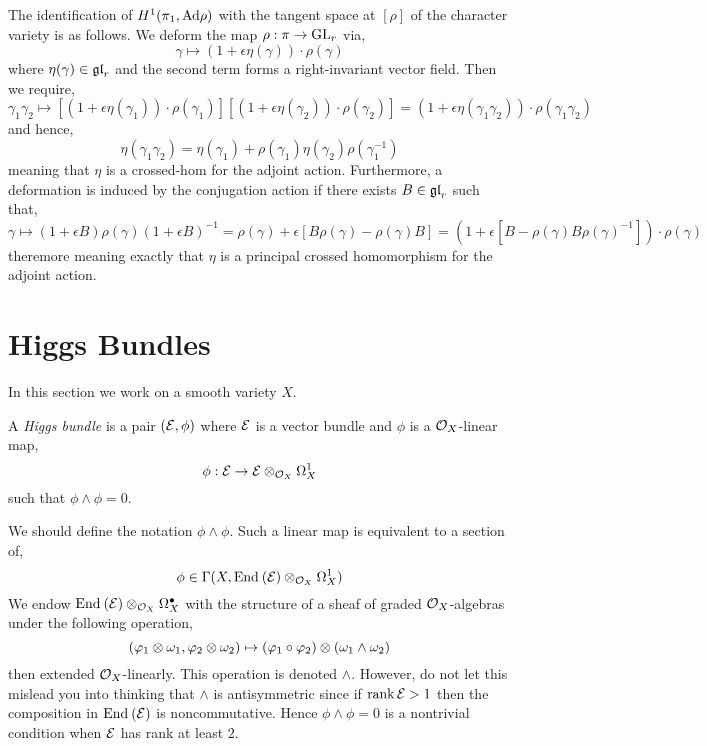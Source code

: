 \documentclass[12pt]{article}
\begin{document}
\begin{rmk}
The identification of $H^1(\pi_1, \mathrm{Ad}{\rho})$ with the tangent space at $[\rho]$ of the character variety is as follows. We deform the map $\rho : \pi \to \mathrm{GL}_r$ via,
\[ \gamma \mapsto (1 + \epsilon \eta(\gamma)) \cdot \rho(\gamma) \]
where $\eta(\gamma) \in \mathfrak{gl}_r$ and the second term forms a right-invariant vector field. Then we require,
\[ \gamma_1 \gamma_2 \mapsto [(1 + \epsilon \eta(\gamma_1)) \cdot \rho(\gamma_1)][(1 + \epsilon \eta(\gamma_2)) \cdot \rho(\gamma_2)] = (1 + \epsilon \eta(\gamma_1 \gamma_2)) \cdot \rho(\gamma_1 \gamma_2) \]
and hence,
\[ \eta(\gamma_1 \gamma_2) = \eta(\gamma_1) + \rho(\gamma_1) \eta(\gamma_2) \rho(\gamma_1^{-1}) \]
meaning that $\eta$ is a crossed-hom for the adjoint action. Furthermore, a deformation is induced by the conjugation action if there exists $B \in \mathfrak{gl}_r$ such that,
\[ \gamma \mapsto (1 + \epsilon B) \rho(\gamma) (1 + \epsilon B)^{-1} = \rho(\gamma) + \epsilon [B \rho(\gamma) - \rho(\gamma) B] = (1 + \epsilon [B - \rho(\gamma) B \rho(\gamma)^{-1}]) \cdot \rho(\gamma) \]
theremore meaning exactly that $\eta$ is a principal crossed homomorphism for the adjoint action.
\end{rmk}

\section{Higgs Bundles}

In this section we work on a smooth variety $X$.

\begin{defn}
A \textit{Higgs bundle} is a pair $(\mathcal{E}, \phi)$ where $\mathcal{E}$ is a vector bundle and $\phi$ is a $\mathcal{O}_{X}$-linear map,
\[ \phi : \mathcal{E} \to \mathcal{E} \otimes_{\mathcal{O}_{X}} \Omega_X^1 \]
such that $\phi \wedge \phi = 0$.
\end{defn}

\begin{rmk}
We should define the notation $\phi \wedge \phi$. Such a linear map is equivalent to a section of,
\[ \phi \in \Gamma(X, \mathrm{End}_{} \left( \mathcal{E} \right) \otimes_{\mathcal{O}_{X}} \Omega^1_X) \]
We endow $\mathrm{End}_{} \left( \mathcal{E} \right) \otimes_{\mathcal{O}_{X}} \Omega^\bullet_X$ with the structure of a sheaf of graded $\mathcal{O}_{X}$-algebras under the following operation,
\[ (\varphi_1 \otimes \omega_1, \varphi_2 \otimes \omega_2) \mapsto (\varphi_1 \circ \varphi_2) \otimes (\omega_1 \wedge \omega_2) \]
then extended $\mathcal{O}_{X}$-linearly. This operation is denoted $\wedge$. However, do not let this mislead you into thinking that $\wedge$ is antisymmetric since if $\operatorname{\mathrm{rank}}{\mathcal{E}} > 1$ then the composition in $\mathrm{End}_{} \left( \mathcal{E} \right)$ is noncommutative. Hence $\phi \wedge \phi = 0$ is a nontrivial condition when $\mathcal{E}$ has rank at least $2$.
\end{rmk}
\end{document}
